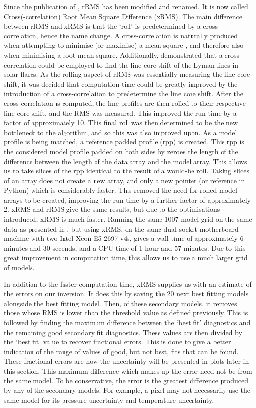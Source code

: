 Since the publication of \cite{peat_solar_2021}, rRMS has been modified and renamed. It is now called Cross(-correlation) Root Mean Square Difference (xRMS). The main difference between rRMS and xRMS is that the `roll' is predetermined by a cross-correlation, hence the name change. A cross-correlation is naturally produced when attempting to minimise (or maximise) a mean square \citep{elliott_handbook_1987}, and therefore also when minimising a root mean square. Additionally, \cite{brown_doppler_2016} demonstrated that a cross correlation could be employed to find the line core shift of the Lyman lines in solar flares. As the rolling aspect of rRMS was essentially measuring the line core shift, it was decided that computation time could be greatly improved by the introduction of a cross-correlation to predetermine the line core shift. After the cross-correlation is computed, the line profiles are then rolled to their respective line core shift, and the RMS was measured. This improved the run time by a factor of approximately 10. This final roll was then determined to be the new bottleneck to the algorithm, and so this was also improved upon. As a model profile is being matched, a reference padded profile (rpp) is created. This rpp is the considered model profile padded on both sides by zeroes the length of the difference between the length of the data array and the model array. This allows us to take slices of the rpp identical to the result of a would-be roll. Taking slices of an array does not create a new array, and only a new pointer (or reference in Python) which is considerably faster. This removed the need for rolled model arrays to be created, improving the run time by a further factor of approximately 2. xRMS and rRMS give the same results, but due to the optimisations introduced, xRMS is much faster. Running the same 1007 model grid on the same data as presented in \cite{peat_solar_2021}, but using xRMS, on the same dual socket motherboard machine with two Intel Xeon E5-2697 v4s, gives a wall time of approximately 6 minutes and 30 seconds, and a CPU time of 1 hour and 57 minutes. Due to this great improvement in computation time, this allows us to use a much larger grid of models.

In addition to the faster computation time, xRMS supplies us with an estimate of the errors on our inversion. It does this by saving the 20 next best fitting models alongside the best fitting model. Then, of these secondary models, it removes those whose RMS is lower than the threshold value as defined previously. This is followed by finding the maximum difference between the `best fit' diagnostics and the remaining good secondary fit diagnostics. These values are then divided by the `best fit' value to recover fractional errors. This is done to give a better indication of the range of values of good, but not best, fits that can be found. These fractional errors are how the uncertainty will be presented in plots later in this section. This maximum difference which makes up the error need not be from the same model. To be conservative, the error is the greatest difference produced by any of the secondary models. For example, a pixel may not necessarily use the same model for its pressure uncertainty and temperature uncertainty.
 
